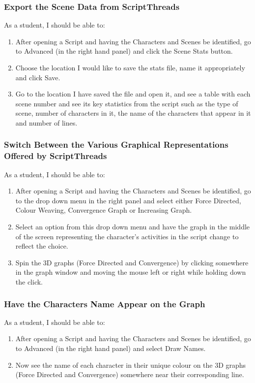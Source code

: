\documentclass{article}
\begin{document}
\subsubsection{Export the Scene Data from ScriptThreads}
As a student, I should be able to:
\begin{enumerate}
    \item After opening a Script and having the Characters and Scenes be identified, go to Advanced (in the right hand panel) and click the Scene Stats button.
    \item Choose the location I would like to save the stats file, name it appropriately and click Save.
    \item Go to the location I have saved the file and open it, and see a table with each scene number and see its key statistics from the script such as the type of scene, number of characters in it, the name of the characters that appear in it and number of lines.
\end{enumerate}

\subsubsection{Switch Between the Various Graphical Representations Offered by ScriptThreads}
As a student, I should be able to:
\begin{enumerate}
    \item After opening a Script and having the Characters and Scenes be identified, go to the drop down menu in the right panel and select either Force Directed, Colour Weaving, Convergence Graph or Increasing Graph.
    \item Select an option from this drop down menu and have the graph in the middle of the screen representing the character's activities in the script change to reflect the choice.
    \item Spin the 3D graphs (Force Directed and Convergence) by clicking somewhere in the graph window and moving the mouse left or right while holding down the click.
\end{enumerate}

\subsubsection{Have the Characters Name Appear on the Graph}
As a student, I should be able to:
\begin{enumerate}
    \item After opening a Script and having the Characters and Scenes be identified, go to Advanced (in the right hand panel) and select Draw Names.
    \item Now see the name of each character in their unique colour on the 3D graphs (Force Directed and Convergence) somewhere near their corresponding line.
\end{enumerate}
\end{document}
